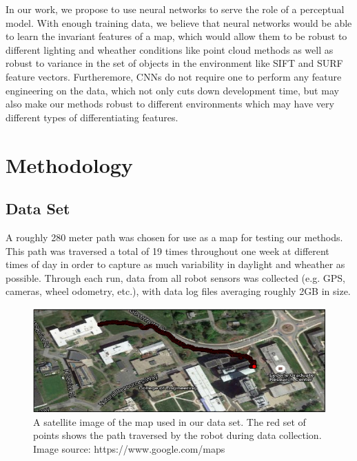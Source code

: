 \documentclass[letterpaper, 12 pt, conference]{ieeeconf}  %
\begin{document}
\par
In our work, we propose to use neural networks to serve the role of a perceptual model. With enough training data, we believe that neural networks would be able to learn the invariant features of a map, which would allow them to be robust to different lighting and wheather conditions like point cloud methods as well as robust to variance in the set of objects in the environment like SIFT and SURF feature vectors. Furtheremore, CNNs do not require one to perform any feature engineering on the data, which not only cuts down development time, but may also make our methods robust to different environments which may have very different types of differentiating features. 

\section{Methodology}

\subsection{Data Set}
A roughly 280 meter path was chosen for use as a map for testing our methods. This path was traversed a total of 19 times throughout one week at different times of day in order to capture as much variability in daylight and wheather as possible. Through each run, data from all robot sensors was collected (e.g. GPS, cameras, wheel odometry, etc.), with data log files averaging roughly 2GB in size. 
\begin{figure}[h]
\centering
\includegraphics[scale=0.5]{map}
\caption{A satellite image of the map used in our data set. The red set of points shows the path traversed by the robot during data collection. Image source: https://www.google.com/maps}
\end{figure}
\end{document}
